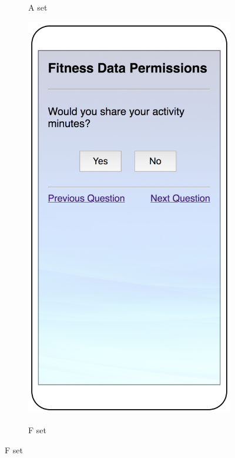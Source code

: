 \begin{figure}
\begin{subfigure}[b]{0.24\textheight}
		\label{fig:directa}
		\caption{A set}
	\end{subfigure}
	\begin{subfigure}[b]{0.24\textheight}
		\includegraphics[width=0.24\textheight]{figures/direct2.png}
		\label{fig:directb}
		\caption{F set}
	\end{subfigure}

\end{figure}
